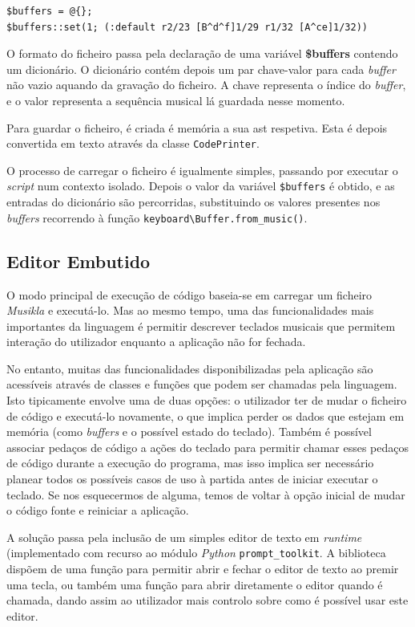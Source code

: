 \begin{lstlisting}[caption={Formato do ficheiro de gravação dos \textit{buffers}.}]
$buffers = @{};
$buffers::set(1; (:default r2/23 [B^d^f]1/29 r1/32 [A^ce]1/32))
\end{lstlisting}

O formato do ficheiro passa pela declaração de uma variável \textbf{\$buffers} contendo um dicionário. O dicionário contém depois um par chave-valor para cada \textit{buffer} não vazio aquando da gravação do ficheiro. A chave representa o índice do \textit{buffer}, e o valor representa a sequência musical lá guardada nesse momento.

Para guardar o ficheiro, é criada é memória a sua \acrshort{ast} respetiva. Esta é depois convertida em texto através da classe \texttt{CodePrinter}.

O processo de carregar o ficheiro é igualmente simples, passando por executar o \textit{script} num contexto isolado. Depois o valor da variável \texttt{\$buffers} é obtido, e as entradas do dicionário são percorridas, substituindo os valores presentes nos \textit{buffers} recorrendo à função \texttt{keyboard\textbackslash{}Buffer.from\_music()}.

\subsection{Editor Embutido}
O modo principal de execução de código baseia-se em carregar um ficheiro \textit{Musikla} e executá-lo. Mas ao mesmo tempo, uma das funcionalidades mais importantes da linguagem é permitir descrever teclados musicais que permitem interação do utilizador enquanto a aplicação não for fechada.

No entanto, muitas das funcionalidades disponibilizadas pela aplicação são acessíveis através de classes e funções que podem ser chamadas pela linguagem. Isto tipicamente envolve uma de duas opções: o utilizador ter de mudar o ficheiro de código e executá-lo novamente, o que implica perder os dados que estejam em memória (como \textit{buffers} e o possível estado do teclado). Também é possível associar pedaços de código a ações do teclado para permitir chamar esses pedaços de código durante a execução do programa, mas isso implica ser necessário planear todos os possíveis casos de uso à partida antes de iniciar executar o teclado. Se nos esquecermos de alguma, temos de voltar à opção inicial de mudar o código fonte e reiniciar a aplicação.

A solução passa pela inclusão de um simples editor de texto em \textit{runtime} (implementado com recurso ao módulo \textit{Python} \texttt{prompt\_toolkit}. A biblioteca dispõem de uma função para permitir abrir e fechar o editor de texto ao premir uma tecla, ou também uma função para abrir diretamente o editor quando é chamada, dando assim ao utilizador mais controlo sobre como é possível usar este editor.

